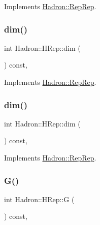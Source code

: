 Implements \mbox{\hyperlink{structHadron_1_1RepRep_a92c8802e5ed7afd7da43ccfd5b7cd92b}{Hadron\+::\+Rep\+Rep}}.

\mbox{\label{structHadron_1_1HRep_a7ed087e9f4edb84e1c537c6c39680b85}} 
\subsubsection{\texorpdfstring{dim()}{dim()}\hspace{0.1cm}{\footnotesize\ttfamily [4/5]}}
{\footnotesize\ttfamily int Hadron\+::\+H\+Rep\+::dim (\begin{DoxyParamCaption}{ }\end{DoxyParamCaption}) const\hspace{0.3cm}{\ttfamily [inline]}, {\ttfamily [virtual]}}



Implements \mbox{\hyperlink{structHadron_1_1RepRep_a92c8802e5ed7afd7da43ccfd5b7cd92b}{Hadron\+::\+Rep\+Rep}}.

\mbox{\label{structHadron_1_1HRep_a7ed087e9f4edb84e1c537c6c39680b85}} 
\subsubsection{\texorpdfstring{dim()}{dim()}\hspace{0.1cm}{\footnotesize\ttfamily [5/5]}}
{\footnotesize\ttfamily int Hadron\+::\+H\+Rep\+::dim (\begin{DoxyParamCaption}{ }\end{DoxyParamCaption}) const\hspace{0.3cm}{\ttfamily [inline]}, {\ttfamily [virtual]}}



Implements \mbox{\hyperlink{structHadron_1_1RepRep_a92c8802e5ed7afd7da43ccfd5b7cd92b}{Hadron\+::\+Rep\+Rep}}.

\mbox{\label{structHadron_1_1HRep_a131ba3bb47daeaf60d4673a2535a5bb2}} 
\subsubsection{\texorpdfstring{G()}{G()}\hspace{0.1cm}{\footnotesize\ttfamily [1/3]}}
{\footnotesize\ttfamily int Hadron\+::\+H\+Rep\+::G (\begin{DoxyParamCaption}{ }\end{DoxyParamCaption}) const\hspace{0.3cm}{\ttfamily [inline]}, {\ttfamily [virtual]}}

